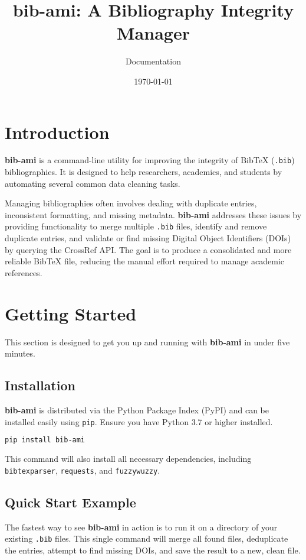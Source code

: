\documentclass[11pt, a4paper]{article}
\title{\textbf{bib-ami}: A Bibliography Integrity Manager}
\author{Documentation}
\date{\today}
\begin{document}
\maketitle
\tableofcontents
\newpage

\section{Introduction}

\textbf{bib-ami} is a command-line utility for improving the integrity of BibTeX (\texttt{.bib}) bibliographies. It is designed to help researchers, academics, and students by automating several common data cleaning tasks.

Managing bibliographies often involves dealing with duplicate entries, inconsistent formatting, and missing metadata. \textbf{bib-ami} addresses these issues by providing functionality to merge multiple \texttt{.bib} files, identify and remove duplicate entries, and validate or find missing Digital Object Identifiers (DOIs) by querying the CrossRef API. The goal is to produce a consolidated and more reliable BibTeX file, reducing the manual effort required to manage academic references.

\section{Getting Started}

This section is designed to get you up and running with \textbf{bib-ami} in under five minutes.

\subsection{Installation}
\textbf{bib-ami} is distributed via the Python Package Index (PyPI) and can be installed easily using \texttt{pip}. Ensure you have Python 3.7 or higher installed.

\begin{lstlisting}[language=bash, caption={Installing bib-ami via pip}]
pip install bib-ami
\end{lstlisting}

This command will also install all necessary dependencies, including \texttt{bibtexparser}, \texttt{requests}, and \texttt{fuzzywuzzy}.

\subsection{Quick Start Example}
The fastest way to see \textbf{bib-ami} in action is to run it on a directory of your existing \texttt{.bib} files. This single command will merge all found files, deduplicate the entries, attempt to find missing DOIs, and save the result to a new, clean file.
\end{document}
